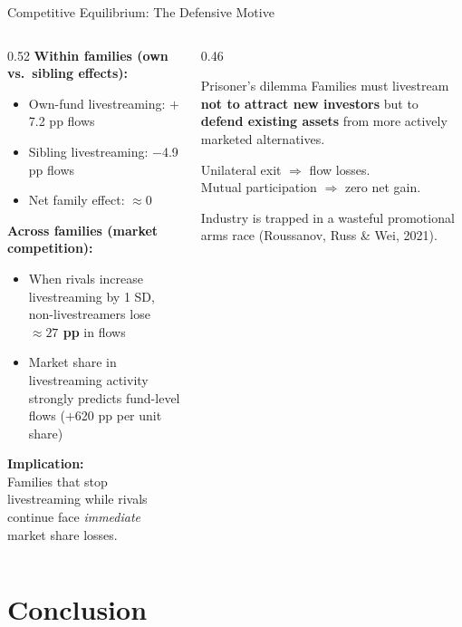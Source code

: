 \documentclass[11pt, aspectratio=169]{beamer}
\newcommand{\hl}[1]{\textcolor{myblue}{\textbf{#1}}}
\newcommand{\good}[1]{\textcolor{mygreen}{#1}}
\newcommand{\bad}[1]{\textcolor{myred}{#1}}
\begin{document}
\begin{frame}{Competitive Equilibrium: The Defensive Motive}

\begin{columns}[T]
\begin{column}{0.52\textwidth}
\textbf{Within families (own vs.\ sibling effects):}
\begin{itemize}
  \item Own-fund livestreaming: \good{$+$7.2 pp} flows
  \item Sibling livestreaming: \bad{$-$4.9 pp} flows
  \item Net family effect: $\approx 0$
\end{itemize}

\vspace{0.2cm}
\textbf{Across families (market competition):}
\begin{itemize}
  \item When rivals increase livestreaming by 1 SD, non-livestreamers
  lose \hl{$\approx 27$ pp} in flows
  \item Market share in livestreaming activity strongly
  predicts fund-level flows ($+$620 pp per unit share)
\end{itemize}

\vspace{0.2cm}
\textbf{Implication:}\\
Families that stop livestreaming while rivals continue
face \emph{immediate} market share losses.
\end{column}
\begin{column}{0.46\textwidth}
\begin{block}{Prisoner's dilemma}
  Families must livestream \textbf{not to attract new investors}
  but to \hl{defend existing assets} from more actively
  marketed alternatives.

  \medskip
  Unilateral exit $\Rightarrow$ flow losses.\\
  Mutual participation $\Rightarrow$ zero net gain.

  \medskip
  Industry is trapped in a wasteful promotional arms race
  (Roussanov, Russ \& Wei, 2021).
\end{block}
\end{column}
\end{columns}

\end{frame}

\section{Conclusion}
\end{document}
